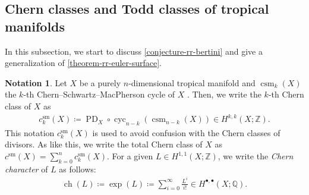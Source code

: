 \documentclass[a4paper,dvipdfmx,reqno,12pt]{amsart}
\theoremstyle{definition}
\newtheorem{notation}[theorem]{Notation}
\newcommand{\deq}{\coloneqq}
\newcommand{\opn}[1]{\operatorname{#1}}
\numberwithin{equation}{section}
\begin{document}
\subsection{Chern classes and Todd classes of
tropical manifolds}
In this subsection, we start to discuss
\cref{conjecture-rr-bertini} and give a generalization
of \cref{theorem-rr-euler-surface}.

\begin{notation}
Let $X$ be a purely $n$-dimensional tropical manifold
and $\opn{csm}_{k}(X)$ the $k$-th
Chern--Schwartz--MacPherson cycle of $X$
\cite[Definition 3.4]{demedrano2023chern}.
Then, we write the $k$-th Chern class of $X$ as
\begin{align}
c_{k}^{\mathrm{sm}}(X)\deq
\opn{PD}_X\circ \opn{cyc}_{n-k}(\opn{csm}_{n-k}(X))
\in H^{k,k}(X;\mathbb{Z}).
\end{align}
This notation $c_{k}^{\mathrm{sm}}(X)$
is used to avoid confusion with the Chern classes of divisors.
As like this, we write the total Chern class of $X$ as
$c^{\mathrm{sm}}(X)=\sum_{k=0}^{n} c_{k}^{\mathrm{sm}}(X)$.
For a given $L\in H^{1,1}(X;\mathbb{Z})$, we write
the \emph{Chern character} of $L$ as follows:
\begin{align}
\opn{ch}(L)\deq \opn{exp}(L)
\deq \sum_{i=0}^{\infty}\frac{L^{i}}{i!}\in 
H^{\bullet,\bullet}(X;\mathbb{Q}).
\end{align}
\end{notation}
\end{document}
